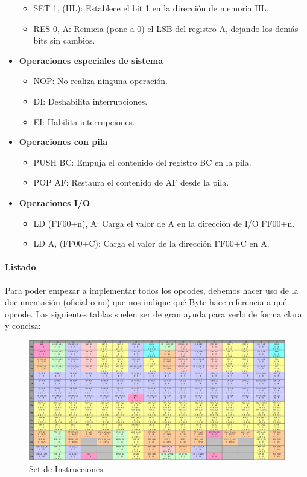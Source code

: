 \begin{itemize}
\begin{itemize}
  \item SET 1, (HL): Establece el bit 1 en la dirección de memoria HL.
  \item RES 0, A: Reinicia (pone a 0) el LSB del registro A, dejando los demás bits sin cambios.
  \end{itemize}
  \item \textbf{Operaciones especiales de sistema}
  \begin{itemize}
  \item NOP: No realiza ninguna operación.
  \item DI: Deshabilita interrupciones.
  \item EI: Habilita interrupciones.
  \end{itemize}
  \item \textbf{Operaciones con pila}
  \begin{itemize}
  \item PUSH BC: Empuja el contenido del registro BC en la pila.
  \item POP AF: Restaura el contenido de AF desde la pila.
  \end{itemize}
  \item \textbf{Operaciones I/O}
  \begin{itemize}
  \item LD (FF00+n), A: Carga el valor de A en la dirección de I/O FF00+n.
  \item LD A, (FF00+C): Carga el valor de la dirección FF00+C en A.
  \end{itemize}
\end{itemize}

\paragraph{Listado}
Para poder empezar a implementar todos los opcodes, debemos hacer uso de la documentación (oficial o no) que nos indique qué Byte hace referencia a qué opcode. Las siguientes tablas suelen ser de gran ayuda para verlo de forma clara y concisa:

\begin{figure}[H]
\centering
\includegraphics[width=1\textwidth]{include/images/opcodes_1.jpg}
\caption{Set de Instrucciones}
\label{figure:opcodes_1}
\end{figure}

